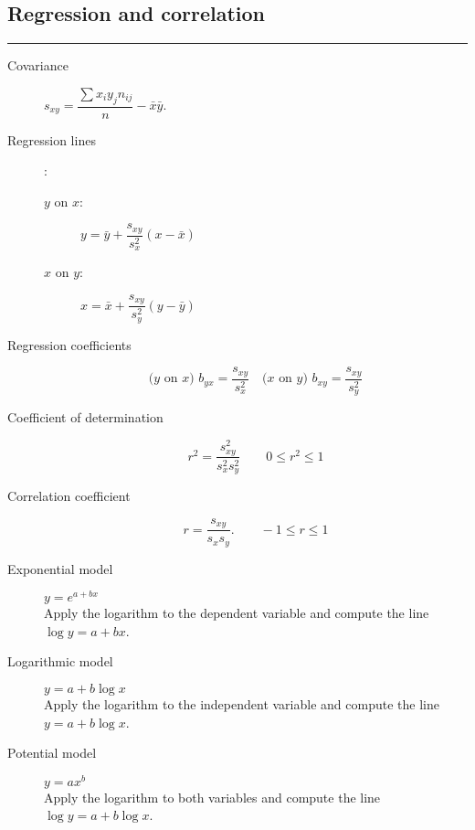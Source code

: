 \documentclass[a4paper, 10pt]{article}
\begin{document}
\subsection*{\sffamily Regression and correlation}
\begin{multicols}{2}
\begin{tcolorbox}[hbox, title=Linear regression]
\begin{varwidth}{0.4\textwidth}
	\rule{\textwidth}{0}
	\begin{description}
		\item [Covariance] $s_{xy}=\dfrac{\sum x_iy_jn_{ij}}{n}-\bar{x}\bar{y}$.
		\item [Regression lines]:
		\begin{description}
			\item [$y$ on $x$:] $y=\bar{y}+\dfrac{s_{xy}}{s_x^2}(x-\bar{x})$
			\item [$x$ on $y$:]	$x=\bar{x}+\dfrac{s_{xy}}{s_y^2}(y-\bar{y})$
		\end{description}
		\item [Regression coefficients]
		\[
		\mbox{($y$ on $x$) } b_{yx}=\dfrac{s_{xy}}{s_x^2}\quad \mbox{($x$ on
		$y$) } b_{xy}=\dfrac{s_{xy}}{s_y^2}
		\]
		\item[Coefficient of determination]
		\[r^2=\dfrac{s_{xy}^2}{s_x^2s_y^2} \qquad 0\leq r^2\leq 1\]

		\item[Correlation coefficient]
		\[r=\dfrac{s_{xy}}{s_xs_y}.\qquad -1\leq r\leq 1\]
	\end{description}
\end{varwidth}
\end{tcolorbox}

\medskip

\begin{tcolorbox}[hbox, title=Non-linear regression]
\begin{varwidth}{0.4\textwidth}
	\begin{description}
	  \item[Exponential model] $y=e^{a+bx}$\\
	  Apply the logarithm to the dependent variable and compute the line $\log y = a+bx$.
	  \item[Logarithmic model] $y=a+b\log x$\\
	  Apply the logarithm to the independent variable and compute the line $y=a+b\log x$.
	  \item[Potential model] $y=ax^b$\\
	  Apply the logarithm to both variables and compute the line $\log y = a+b\log x$.
	\end{description}
\end{varwidth}
\end{tcolorbox}
\end{multicols}
\end{document}

